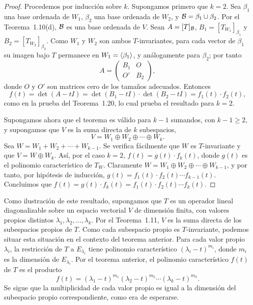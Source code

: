\documentclass[12pt,a4paper]{book}
\begin{document}
    \begin{proof}
        Procedemos por inducción sobre $k$. Supongamos primero que $k=2$. Sea $\beta_1$ una base ordenada de $W_1$, $\beta_2$ una base ordenada de $W_2$, y $\mathcal{B}=\beta_1\cup\beta_2$. Por el Teorema~1.10(d), $\mathcal{B}$ es una base ordenada de $V$. Sean $A=[T]_{\mathcal{B}}$, $B_1=[T_{W_1}]_{\beta_1}$ y $B_2=[T_{W_2}]_{\beta_2}$. Como $W_1$ y $W_2$ son ambos $T$-invariantes, para cada vector de $\beta_1$ su imagen bajo $T$ permanece en $W_1=\langle \beta_1 \rangle$, y análogamente para $\beta_2$; por tanto
        \begin{equation*}
            A=\begin{pmatrix}B_1&O\\O'&B_2\end{pmatrix},
        \end{equation*}
        donde $O$ y $O'$ son matrices cero de los tamaños adecuados. Entonces
        \begin{equation*}
            f(t)=\det(A-tI)=\det(B_1-tI)\cdot\det(B_2-tI)=f_1(t)\cdot f_2(t),
        \end{equation*}
        como en la prueba del Teorema~1.20, lo cual prueba el resultado para $k=2$.

        Supongamos ahora que el teorema es válido para $k-1$ sumandos, con $k-1\geq 2$, y supongamos que $V$ es la suma directa de $k$ subespacios,
        \begin{equation*}
            V=W_1\oplus W_2\oplus\cdots\oplus W_k.
        \end{equation*}
        Sea $W=W_1+W_2+\cdots+W_{k-1}$. Se verifica fácilmente que $W$ es $T$-invariante y que $V=W\oplus W_k$. Así, por el caso $k=2$, $f(t)=g(t)\cdot f_k(t)$, donde $g(t)$ es el polinomio característico de $T_W$. Claramente $W=W_1\oplus W_2\oplus\cdots\oplus W_{k-1}$, y por tanto, por hipótesis de inducción, $g(t)=f_1(t)\cdot f_2(t)\cdots f_{k-1}(t)$. Concluimos que $f(t)=g(t)\cdot f_k(t)=f_1(t)\cdot f_2(t)\cdots f_k(t)$.
    \end{proof}

    Como ilustración de este resultado, supongamos que $T$ es un operador lineal diagonalizable sobre un espacio vectorial $V$ de dimensión finita, con valores propios distintos $\lambda_1,\lambda_2,\dots,\lambda_k$. Por el Teorema~1.11, $V$ es la suma directa de los subespacios propios de $T$. Como cada subespacio propio es $T$-invariante, podemos situar esta situación en el contexto del teorema anterior. Para cada valor propio $\lambda_i$, la restricción de $T$ a $E_{\lambda_i}$ tiene polinomio característico $(\lambda_i-t)^{m_i}$, donde $m_i$ es la dimensión de $E_{\lambda_i}$. Por el teorema anterior, el polinomio característico $f(t)$ de $T$ es el producto
    \begin{equation*}
        f(t)=(\lambda_1-t)^{m_1}(\lambda_2-t)^{m_2}\cdots(\lambda_k-t)^{m_k}.
    \end{equation*}
    Se sigue que la multiplicidad de cada valor propio es igual a la dimensión del subespacio propio correspondiente, como era de esperarse.
\end{document}
